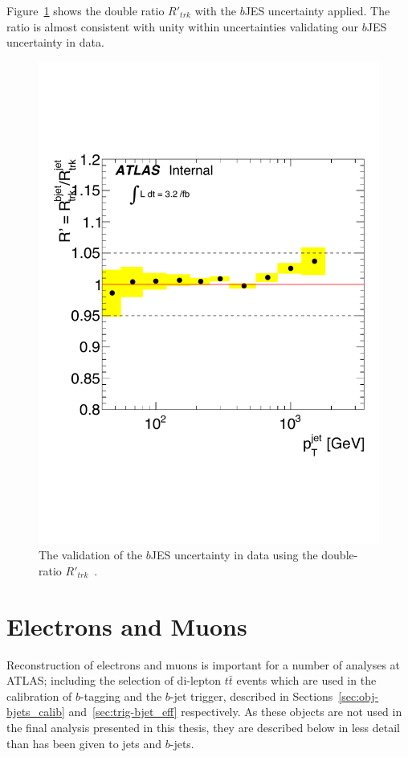 Figure~\ref{fig:obj-bjets_bJES_Rprime} shows the double ratio $R'_{trk}$ with the $b$JES uncertainty applied.
The ratio is almost consistent with unity within uncertainties validating our $b$JES uncertainty in data.

  \begin{figure}[!ht]
  \begin{center}
      \includegraphics[width=0.6\linewidth, angle=0]{figs/Objects/bjets_bJES_Rprime_edit.pdf}
  \end{center}
  \caption[The validation of the $b$JES uncertainty in data using the double-ratio $R'_{trk}$.]
          {The validation of the $b$JES uncertainty in data using the double-ratio $R'_{trk}$~\cite{dibjet-int_mori16}.}
  \label{fig:obj-bjets_bJES_Rprime}
\end{figure}







\newpage
\section{Electrons and Muons}
\label{sec:obj-leptons}

Reconstruction of electrons and muons
is important for a number of analyses at ATLAS;
including the selection of di-lepton $t\bar{t}$ events
which are used in the calibration of $b$-tagging and the $b$-jet trigger,
described in Sections~\ref{sec:obj-bjets_calib} and~\ref{sec:trig-bjet_eff} respectively.
As these objects are not used in the final analysis presented in this thesis,
they are described below in less detail than has been given to jets and $b$-jets.

